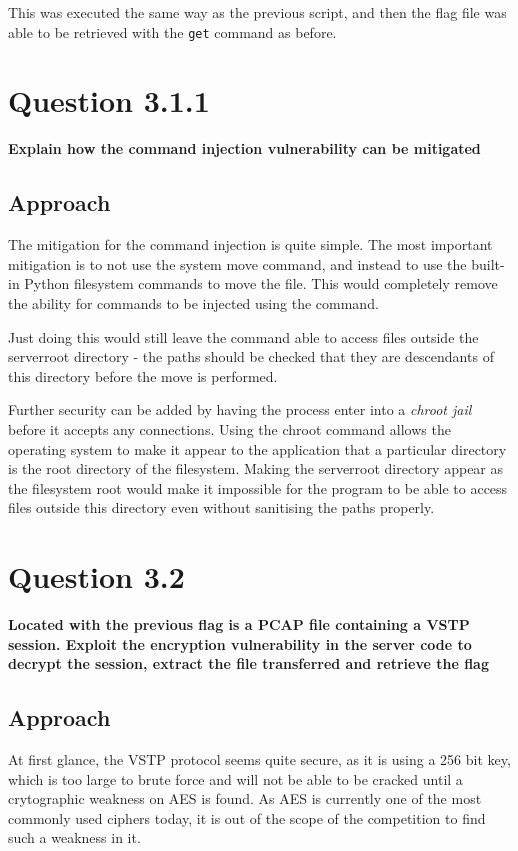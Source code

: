 This was executed the same way as the previous script, and then the flag file
was able to be retrieved with the \texttt{get} command as before.

\section{Question 3.1.1}
\textbf{Explain how the command injection vulnerability can be mitigated}
\subsection{Approach}
The mitigation for the command injection is quite simple. The most important
mitigation is to not use the system move command, and instead to use the
built-in Python filesystem commands to move the file. This would completely
remove the ability for commands to be injected using the command.

Just doing this would still leave the command able to access files outside the
serverroot directory - the paths should be checked that they are descendants
of this directory before the move is performed.

Further security can be added by having the process enter into a 
\textit{chroot jail} before it accepts any connections. Using the chroot command
allows the operating system to make it appear to the application that a 
particular directory is the root directory of the filesystem. Making the
serverroot directory appear as the filesystem root would make it impossible for
the program to be able to access files outside this directory even without
sanitising the paths properly.

\section{Question 3.2}
\textbf{Located with the previous flag is a PCAP file containing a VSTP session.
Exploit the encryption vulnerability in the server code to decrypt the session,
extract the file transferred and retrieve the flag}
\subsection{Approach}
At first glance, the VSTP protocol seems quite secure, as it is using a 256
bit key, which is too large to brute force and will not be able to be cracked
until a crytographic weakness on AES is found. As AES is currently one of the
most commonly used ciphers today, it is out of the scope of the competition to
find such a weakness in it.

